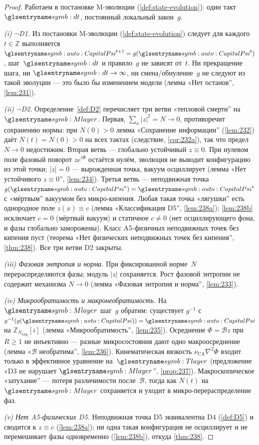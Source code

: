 \begin{proof}
Работаем в постановке M-эволюции (\cref{def:state-evolution}): один такт~$\htick$, постоянный локальный закон~$g$.

\smallskip
\emph{(i) $\neg$D1.}
Из постановки M-эволюции (\cref{def:state-evolution}) следует для каждого $t\in\mathbb{Z}$ выполняется $\symCapitalPsi^{t+1}=g(\symCapitalPsi^t)$,
шаг~$\htick$ и правило~$g$ не зависят от~$t$.
Ни прекращение шага, ни $\htick\to\infty$, ни смена/обнуление~$g$ не следуют из такой эволуции ---
это было бы изменением модели (лемма «Нет останов'', \ref{lem:231}).

\smallskip
\emph{(ii) $\neg$D2.}
Определение~\ref{def:D2} перечисляет три ветви «тепловой смерти'' на~$\Mlayer$.
Первая, $\sum_x|z|^2=N\to 0$, противоречит сохранению нормы:
при $N(0)>0$ лемма «Сохранение информации'' (\ref{lem:232}) даёт $N(t)=N(0)>0$ на всех тактах
(следствие, \ref{cor:232a}), так что предел $N\to 0$ недостижим.
Вторая ветвь --- глобально устойчивый $z\equiv 0$.
При нулевом поле фазовый поворот $z e^{i\Phi}$ остаётся нулём, эволюция не выводит конфигурацию
из этой точки; $|z|=0$ --- вырожденная точка, вакуум осциллирует
(лемма «Нет устойчивого $z\equiv 0$'', \ref{lem:234}).
Третья ветвь --- неподвижная точка $g(\symCapitalPsi^*)=\symCapitalPsi^*$ с «мёртвым'' вакуумом без микро-кипения.
Любая такая точка «лягушки'' есть однородное поле $z(x)\equiv c$ (лемма «Классификация D5'', \ref{lem:238a});
\ref{lem:238b} исключает $c=0$ (мёртвый вакуум) и статичное $c\ne 0$
(нет осциллирующего фона, и фазы глобально заморожены).
Класс A5-физичных неподвижных точек без кипения пуст (теорема «Нет физических неподвижных точек без кипения'', \ref{thm:238}).
Все три ветви D2 закрыты.

\smallskip
\emph{(iii) Фазовая энтропия и норма.}
При фиксированной норме~$N$ перераспределяются фазы;
модуль $|z|$ сохраняется.
Рост фазовой энтропии не содержит механизма $N\to 0$ (лемма «Фазовая энтропия и норма'', \ref{lem:233}).

\smallskip
\emph{(iv) Микрообратимость и макронеобратимость.}
На~$\Mlayer$ шаг~$g$ обратим: существует $g^{-1}$ с $g^{-1}(g(\symCapitalPsi))=\symCapitalPsi$
на $\mathbb{Z}_{N_{\mathrm{ring}}}[i]$ (лемма «Микрообратимость'', \ref{lem:235}).
Осреднение $\Phi=\mathcal{B}z$ при $R\ge 1$ не инъективно --- разные микросостояния дают одно макроосреднение
(лемма «$\mathcal{B}$ необратима'', \ref{lem:236}).
Кинематическая вязкость $\nu_{\mathrm{CA}}\nabla^2\Phi$ входит только в эффективное уравнение на~$\Tlayer$
(предложение «D3 не нарушает $\Mlayer$'', \ref{prop:237}). Макроскопическое «затухание'' --- потеря различимости после~$\mathcal{B}$,
тогда как $N(t)$ на~$\Mlayer$ сохраняется и уходит в микро-перераспределение фаз.

\smallskip
\emph{(v) Нет A5-физических D5.}
Неподвижная точка D5 эквивалентна D4 (\ref{def:D5}) и сводится к $z\equiv c$ (\ref{lem:238a});
ни одна такая конфигурация не осциллирует и не перемешивает фазы одновременно (\ref{lem:238b}),
откуда \ref{thm:238}.
\end{proof}
